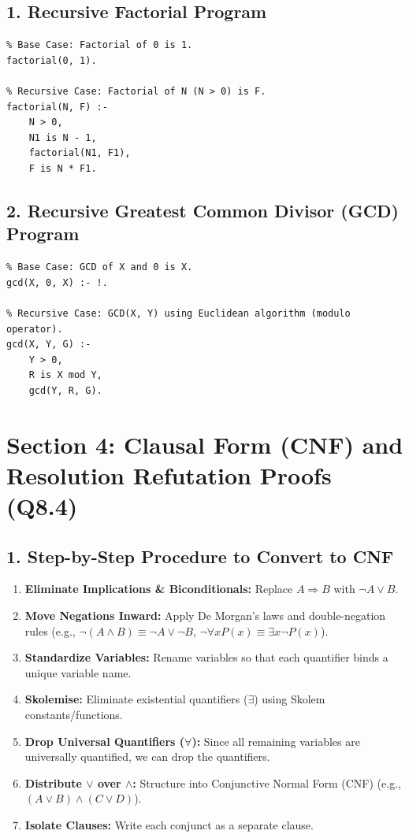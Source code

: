 \subsection{1. Recursive Factorial Program}
\begin{lstlisting}
% Base Case: Factorial of 0 is 1.
factorial(0, 1).

% Recursive Case: Factorial of N (N > 0) is F.
factorial(N, F) :-
    N > 0,
    N1 is N - 1,
    factorial(N1, F1),
    F is N * F1.
\end{lstlisting}

\subsection{2. Recursive Greatest Common Divisor (GCD) Program}
\begin{lstlisting}
% Base Case: GCD of X and 0 is X.
gcd(X, 0, X) :- !.

% Recursive Case: GCD(X, Y) using Euclidean algorithm (modulo operator).
gcd(X, Y, G) :-
    Y > 0,
    R is X mod Y,
    gcd(Y, R, G).
\end{lstlisting}


\section{Section 4: Clausal Form (CNF) and Resolution Refutation Proofs (Q8.4)}

\subsection{1. Step-by-Step Procedure to Convert to CNF}
\begin{enumerate}
  \item \textbf{Eliminate Implications \& Biconditionals:} Replace $A \Rightarrow B$ with $\neg A \lor B$.
  \item \textbf{Move Negations Inward:} Apply De Morgan's laws and double-negation rules (e.g., $\neg(A \land B) \equiv \neg A \lor \neg B$, $\neg \forall x P(x) \equiv \exists x \neg P(x)$).
  \item \textbf{Standardize Variables:} Rename variables so that each quantifier binds a unique variable name.
  \item \textbf{Skolemise:} Eliminate existential quantifiers ($\exists$) using Skolem constants/functions.
  \item \textbf{Drop Universal Quantifiers ($\forall$):} Since all remaining variables are universally quantified, we can drop the quantifiers.
  \item \textbf{Distribute $\lor$ over $\land$:} Structure into Conjunctive Normal Form (CNF) (e.g., $(A \lor B) \land (C \lor D)$).
  \item \textbf{Isolate Clauses:} Write each conjunct as a separate clause.
\end{enumerate}


